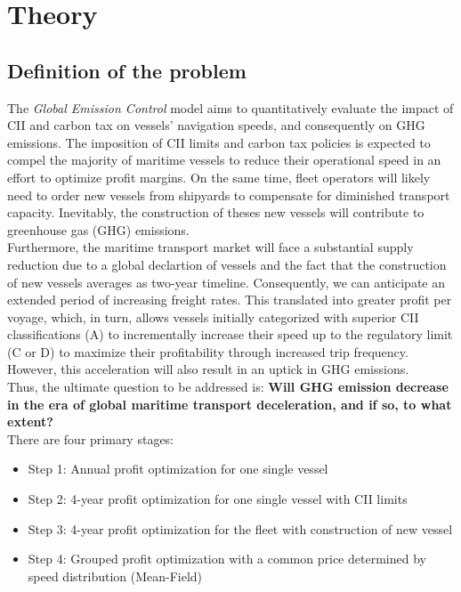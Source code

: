 \documentclass[a4paper,12pt]{article}
\begin{document}

\section{Theory}

\subsection{Definition of the problem}

The \textit{Global Emission Control} model aims to quantitatively evaluate the impact of CII and carbon tax on vessels' navigation speeds, and consequently on GHG emissions.
The imposition of CII limits and carbon tax policies is expected to compel the majority of maritime vessels to reduce their operational speed in an effort to optimize profit margins.
On the same time, fleet operators will likely need to order new vessels from shipyards to compensate for diminished transport capacity.
Inevitably, the construction of theses new vessels will contribute to greenhouse gas (GHG) emissions.\\

Furthermore, the maritime transport market will face a substantial supply reduction due to a global declartion of vessels and the fact that the construction of new vessels averages as two-year timeline.
Consequently, we can anticipate an extended period of increasing freight rates.
This translated into greater profit per voyage, which, in turn, allows vessels initially categorized with superior CII classifications (A) to incrementally increase their speed up to the regulatory limit (C or D) to maximize their profitability through increased trip frequency.
However, this acceleration will also result in an uptick in GHG emissions.\\

Thus, the ultimate question to be addressed is: \textbf{Will GHG emission decrease in the era of global maritime transport deceleration, and if so, to what extent?}\\

There are four primary stages:
\begin{itemize}
	\item Step 1: Annual profit optimization for one single vessel
	\item Step 2: 4-year profit optimization for one single vessel with CII limits
	\item Step 3: 4-year profit optimization for the fleet with construction of new vessel
	\item Step 4: Grouped profit optimization with a common price determined by speed distribution (Mean-Field) \\
\end{itemize}
\end{document}
